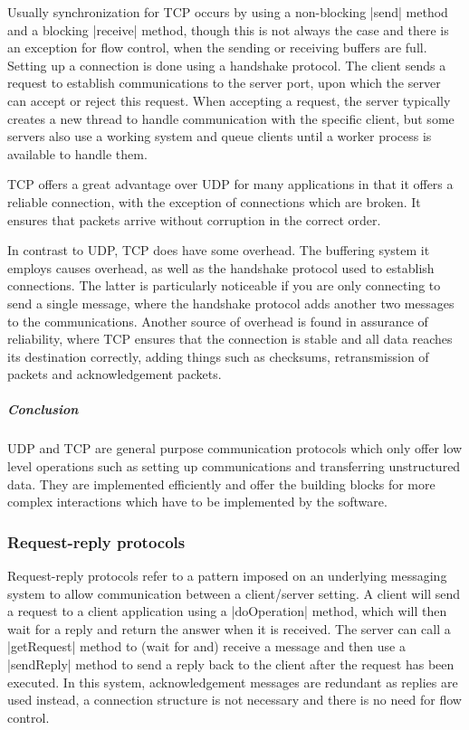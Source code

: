 \documentclass[a4paper]{article}
\begin{document}
Usually synchronization for TCP occurs by using a non-blocking |send| method and a blocking |receive| method, though this is not always the case and there is an exception for flow control, when the sending or receiving buffers are full. Setting up a connection is done using a handshake protocol. The client sends a request to establish communications to the server port, upon which the server can accept or reject this request. When accepting a request, the server typically creates a new thread to handle communication with the specific client, but some servers also use a working system and queue clients until a worker process is available to handle them.

TCP offers a great advantage over UDP for many applications in that it offers a reliable connection, with the exception of connections which are broken. It ensures that packets arrive without corruption in the correct order.

In contrast to UDP, TCP does have some overhead. The buffering system it employs causes overhead, as well as the handshake protocol used to establish connections. The latter is particularly noticeable if you are only connecting to send a single message, where the handshake protocol adds another two messages to the communications. Another source of overhead is found in assurance of reliability, where TCP ensures that the connection is stable and all data reaches its destination correctly, adding things such as checksums, retransmission of packets and acknowledgement packets.

\subparagraph*{Conclusion}

UDP and TCP are general purpose communication protocols which only offer low level operations such as setting up communications and transferring unstructured data. They are implemented efficiently and offer the building blocks for more complex interactions which have to be implemented by the software.

\subsubsection{Request-reply protocols}

Request-reply protocols refer to a pattern imposed on an underlying messaging system to allow communication between a client/server setting. A client will send a request to a client application using a |doOperation| method, which will then wait for a reply and return the answer when it is received. The server can call a |getRequest| method to (wait for and) receive a message and then use a |sendReply| method to send a reply back to the client after the request has been executed. In this system, acknowledgement messages are redundant as replies are used instead, a connection structure is not necessary and there is no need for flow control.
\end{document}
